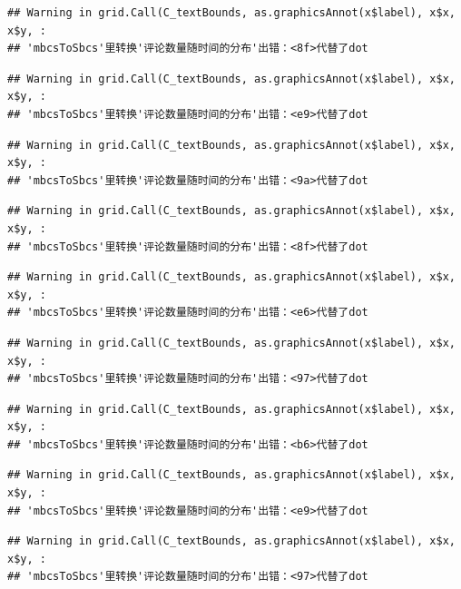 \documentclass[
]{article}
\begin{document}
\begin{verbatim}
## Warning in grid.Call(C_textBounds, as.graphicsAnnot(x$label), x$x, x$y, :
## 'mbcsToSbcs'里转换'评论数量随时间的分布'出错：<8f>代替了dot
\end{verbatim}

\begin{verbatim}
## Warning in grid.Call(C_textBounds, as.graphicsAnnot(x$label), x$x, x$y, :
## 'mbcsToSbcs'里转换'评论数量随时间的分布'出错：<e9>代替了dot
\end{verbatim}

\begin{verbatim}
## Warning in grid.Call(C_textBounds, as.graphicsAnnot(x$label), x$x, x$y, :
## 'mbcsToSbcs'里转换'评论数量随时间的分布'出错：<9a>代替了dot
\end{verbatim}

\begin{verbatim}
## Warning in grid.Call(C_textBounds, as.graphicsAnnot(x$label), x$x, x$y, :
## 'mbcsToSbcs'里转换'评论数量随时间的分布'出错：<8f>代替了dot
\end{verbatim}

\begin{verbatim}
## Warning in grid.Call(C_textBounds, as.graphicsAnnot(x$label), x$x, x$y, :
## 'mbcsToSbcs'里转换'评论数量随时间的分布'出错：<e6>代替了dot
\end{verbatim}

\begin{verbatim}
## Warning in grid.Call(C_textBounds, as.graphicsAnnot(x$label), x$x, x$y, :
## 'mbcsToSbcs'里转换'评论数量随时间的分布'出错：<97>代替了dot
\end{verbatim}

\begin{verbatim}
## Warning in grid.Call(C_textBounds, as.graphicsAnnot(x$label), x$x, x$y, :
## 'mbcsToSbcs'里转换'评论数量随时间的分布'出错：<b6>代替了dot
\end{verbatim}

\begin{verbatim}
## Warning in grid.Call(C_textBounds, as.graphicsAnnot(x$label), x$x, x$y, :
## 'mbcsToSbcs'里转换'评论数量随时间的分布'出错：<e9>代替了dot
\end{verbatim}

\begin{verbatim}
## Warning in grid.Call(C_textBounds, as.graphicsAnnot(x$label), x$x, x$y, :
## 'mbcsToSbcs'里转换'评论数量随时间的分布'出错：<97>代替了dot
\end{verbatim}
\end{document}
